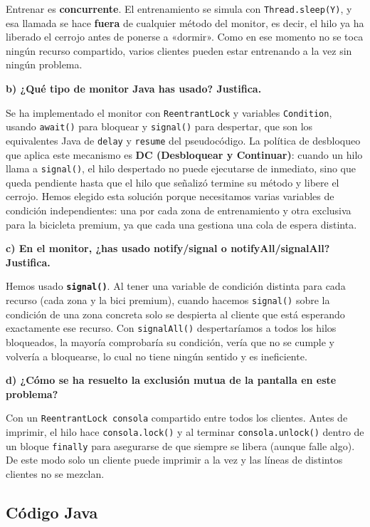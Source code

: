 \documentclass[12pt,a4paper]{article}
\begin{document}
Entrenar es \textbf{concurrente}. El entrenamiento se simula con \texttt{Thread.sleep(Y)}, y esa llamada se hace \textbf{fuera} de cualquier método del monitor, es decir, el hilo ya ha liberado el cerrojo antes de ponerse a «dormir». Como en ese momento no se toca ningún recurso compartido, varios clientes pueden estar entrenando a la vez sin ningún problema.

\textbf{b) ¿Qué tipo de monitor Java has usado? Justifica.}

Se ha implementado el monitor con \texttt{ReentrantLock} y variables \texttt{Condition}, usando \texttt{await()} para bloquear y \texttt{signal()} para despertar, que son los equivalentes Java de \texttt{delay} y \texttt{resume} del pseudocódigo. La política de desbloqueo que aplica este mecanismo es \textbf{DC (Desbloquear y Continuar)}: cuando un hilo llama a \texttt{signal()}, el hilo despertado no puede ejecutarse de inmediato, sino que queda pendiente hasta que el hilo que señalizó termine su método y libere el cerrojo. Hemos elegido esta solución porque necesitamos varias variables de condición independientes: una por cada zona de entrenamiento y otra exclusiva para la bicicleta premium, ya que cada una gestiona una cola de espera distinta.

\textbf{c) En el monitor, ¿has usado notify/signal o notifyAll/signalAll? Justifica.}

Hemos usado \textbf{\texttt{signal()}}. Al tener una variable de condición distinta para cada recurso (cada zona y la bici premium), cuando hacemos \texttt{signal()} sobre la condición de una zona concreta solo se despierta al cliente que está esperando exactamente ese recurso. Con \texttt{signalAll()} despertaríamos a todos los hilos bloqueados, la mayoría comprobaría su condición, vería que no se cumple y volvería a bloquearse, lo cual no tiene ningún sentido y es ineficiente.

\textbf{d) ¿Cómo se ha resuelto la exclusión mutua de la pantalla en este problema?}

Con un \texttt{ReentrantLock consola} compartido entre todos los clientes. Antes de imprimir, el hilo hace \texttt{consola.lock()} y al terminar \texttt{consola.unlock()} dentro de un bloque \texttt{finally} para asegurarse de que siempre se libera (aunque falle algo). De este modo solo un cliente puede imprimir a la vez y las líneas de distintos clientes no se mezclan.
\subsection{Código Java}
\end{document}
